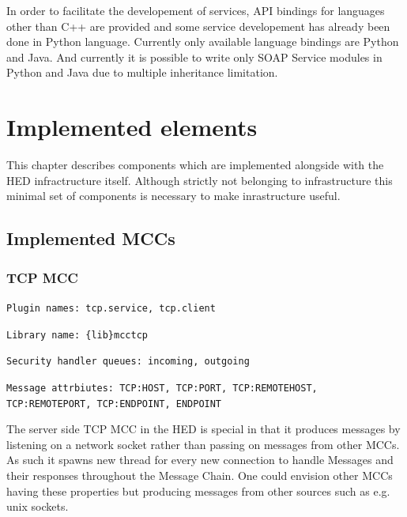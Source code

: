 \documentclass{book}
\begin{document}
In order to facilitate the developement of services, API bindings for languages other than C++ are provided and some service developement has already been done in Python language. Currently only available language bindings are Python and Java. And currently it is possible to write only SOAP Service modules in Python and Java due to multiple inheritance limitation.



\chapter{Implemented elements}

This chapter describes components which are implemented alongside with the HED infractructure itself. Although strictly not belonging to infrastructure this minimal set of components is necessary to make inrastructure useful.


\section{Implemented MCCs}


\subsection{TCP MCC}

\texttt{Plugin names: tcp.service, tcp.client}

\texttt{Library name: \{lib\}mcctcp}

\texttt{Security handler queues: incoming, outgoing}

\texttt{Message attrbiutes: TCP:HOST, TCP:PORT, TCP:REMOTEHOST, TCP:REMOTEPORT, TCP:ENDPOINT, ENDPOINT}


The server side TCP MCC in the HED is special in that it produces messages by listening on a network socket rather than passing on messages from other MCCs. As such it spawns new thread for every new connection to handle Messages and their responses throughout the Message Chain. One could envision other MCCs having these properties but producing messages from other sources such as e.g. unix sockets.

\end{document}
